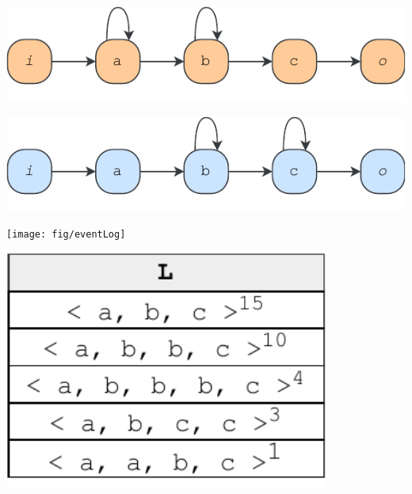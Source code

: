 \begin{minipage}{\textwidth}
	\begin{minipage}{0.34\textwidth}
		\begin{minipage}{\textwidth}
			\centering
			\includegraphics[width=\textwidth]{fig/system3}
			\vspace{-2em}
			\label{fig:sys3}
		\end{minipage}
		\begin{minipage}{\textwidth}
			\centering
			\includegraphics[width=\textwidth]{fig/model3}
			\vspace{-2em}
			\label{fig:model3}
		\end{minipage}
	\end{minipage}%
	\hfill
	\begin{minipage}{0.3\textwidth}
		\centering
		\texttt{[image: fig/eventLog]}
		\label{fig:log1}
	\end{minipage}
	\begin{minipage}{0.32\textwidth}
		\centering
		\includegraphics[width=0.8\textwidth]{fig/log3}
		\label{fig:log3}
	\end{minipage}
\end{minipage}


